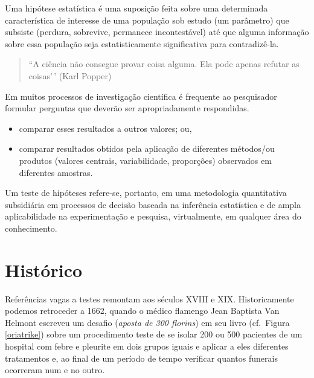 \documentclass[
]{book}
\providecommand{\tightlist}{%
  \setlength{\itemsep}{0pt}\setlength{\parskip}{0pt}}
\begin{document}
\hfill\break

Uma hipótese estatística é uma suposição feita sobre uma determinada característica de interesse de uma população sob estudo (um parâmetro) que subsiste (perdura, sobrevive, permanece incontestável) até que alguma informação sobre essa população seja estatisticamente significativa para contradizê-la.

\hfill\break

\begin{quote}
``A ciência não consegue provar coisa alguma. Ela pode apenas refutar as coisas'\,' (Karl Popper)
\end{quote}

\hfill\break

Em muitos processos de investigação científica é frequente ao pesquisador formular perguntas que deverão ser apropriadamente respondidas.

\hfill\break

\begin{itemize}
\tightlist
\item
  comparar esses resultados a outros valores; ou,\\
\item
  comparar resultados obtidos pela aplicação de diferentes métodos/ou produtos (valores centrais, variabilidade, proporções) observados em diferentes amostras.
\end{itemize}

\hfill\break

Um teste de hipóteses refere-se, portanto, em uma metodologia quantitativa subsidiária em processos de decisão baseada na inferência estatística e de ampla aplicabilidade na experimentação e pesquisa, virtualmente, em qualquer área do conhecimento.

\hfill\break

\hypertarget{histuxf3rico}{%
\section{Histórico}\label{histuxf3rico}}

\hfill\break

Referências vagas a testes remontam aos séculos XVIII e XIX. Historicamente podemos retroceder a 1662, quando o médico flamengo Jean Baptista Van Helmont escreveu um desafio (\emph{aposta de 300 florins}) em seu livro (cf.~Figura \ref{oriatrike}) sobre um procedimento teste de se isolar 200 ou 500 pacientes de um hospital com febre e pleurite em dois grupos iguais e aplicar a eles diferentes tratamentos e, ao final de um período de tempo verificar quantos funerais ocorreram num e no outro.
\end{document}
